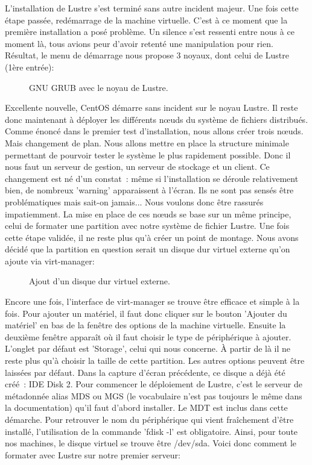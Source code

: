 \documentclass[12pt]{article}
\begin{document}
L'installation de Lustre s'est terminé sans autre incident majeur. Une fois cette étape passée, redémarrage de la machine virtuelle. C'est à ce moment que la première installation a posé problème. Un silence s'est ressenti entre nous à ce moment là, tous avions peur d'avoir retenté une manipulation pour rien. Résultat, le menu de démarrage nous propose 3 noyaux, dont celui de Lustre (1ère entrée):

\begin{figure}[H]
\caption{GNU GRUB avec le noyau de Lustre.}
\label{fig:identification}
\end{figure}

Excellente nouvelle, CentOS démarre sans incident sur le noyau Lustre. Il reste donc maintenant à déployer les différents nœuds du système de fichiers distribués. Comme énoncé dans le premier test d'installation, nous allons créer trois nœuds. Mais changement de plan. Nous allons mettre en place la structure minimale permettant de pourvoir tester le système le plus rapidement possible. Donc il nous faut un serveur de gestion, un serveur de stockage et un client. Ce changement est né d'un constat : même si l'installation se déroule relativement bien, de nombreux 'warning' apparaissent à l'écran. Ils ne sont pas sensés être problématiques mais sait-on jamais... Nous voulons donc être rassurés impatiemment. La mise en place de ces nœuds se base sur un même principe, celui de formater une partition avec notre système de fichier Lustre. Une fois cette étape validée, il ne reste plus qu'à créer un point de montage. Nous avons décidé que la partition en question serait un disque dur virtuel externe qu'on ajoute via virt-manager:

\begin{figure}[H]
\caption{Ajout d'un disque dur virtuel externe.}
\label{fig:identification}
\end{figure}

Encore une fois, l'interface de virt-manager se trouve être efficace et simple à la fois. Pour ajouter un matériel, il faut donc cliquer sur le bouton 'Ajouter du matériel' en bas de la fenêtre des options de la machine virtuelle. Ensuite la deuxième fenêtre apparaît où il faut choisir le type de périphérique à ajouter. L'onglet par défaut est 'Storage', celui qui nous concerne. À partir de là il ne reste plus qu'à choisir la taille de cette partition. Les autres options peuvent être laissées par défaut. Dans la capture d'écran précédente, ce disque a déjà été créé : IDE Disk 2. Pour commencer le déploiement de Lustre, c'est le serveur de métadonnée alias MDS ou MGS (le vocabulaire n'est pas toujours le même dans la documentation) qu'il faut d'abord installer. Le MDT est inclus dans cette démarche. Pour retrouver le nom du périphérique qui vient fraîchement d'être installé, l'utilisation de la commande 'fdisk -l' est obligatoire. Ainsi, pour toute nos machines, le disque virtuel se trouve être /dev/sda. Voici donc comment le formater avec Lustre sur notre premier serveur:
\end{document}
